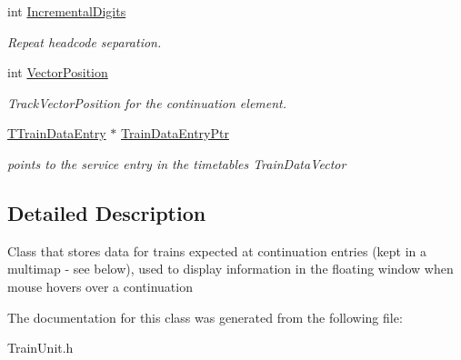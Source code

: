 \begin{DoxyCompactItemize}
\mbox{\label{class_t_train_controller_1_1_t_continuation_train_expectation_entry_af6516a6832fe532a42fd3757fa4143a0}} 
int \mbox{\hyperlink{class_t_train_controller_1_1_t_continuation_train_expectation_entry_af6516a6832fe532a42fd3757fa4143a0}{Incremental\+Digits}}
\begin{DoxyCompactList}\small\item\em Repeat headcode separation. \end{DoxyCompactList}\item 
\mbox{\label{class_t_train_controller_1_1_t_continuation_train_expectation_entry_a77f5a64b552a6d938b1ab2a0e3488c11}} 
int \mbox{\hyperlink{class_t_train_controller_1_1_t_continuation_train_expectation_entry_a77f5a64b552a6d938b1ab2a0e3488c11}{Vector\+Position}}
\begin{DoxyCompactList}\small\item\em Track\+Vector\+Position for the continuation element. \end{DoxyCompactList}\item 
\mbox{\label{class_t_train_controller_1_1_t_continuation_train_expectation_entry_ad710cc4b0bde6c917aaba9c732773bcb}} 
\mbox{\hyperlink{class_t_train_data_entry}{T\+Train\+Data\+Entry}} $\ast$ \mbox{\hyperlink{class_t_train_controller_1_1_t_continuation_train_expectation_entry_ad710cc4b0bde6c917aaba9c732773bcb}{Train\+Data\+Entry\+Ptr}}
\begin{DoxyCompactList}\small\item\em points to the service entry in the timetable\textquotesingle{}s Train\+Data\+Vector \end{DoxyCompactList}\end{DoxyCompactItemize}


\subsection{Detailed Description}
Class that stores data for trains expected at continuation entries (kept in a multimap -\/ see below), used to display information in the floating window when mouse hovers over a continuation 

The documentation for this class was generated from the following file\+:\begin{DoxyCompactItemize}
\item 
Train\+Unit.\+h\end{DoxyCompactItemize}
